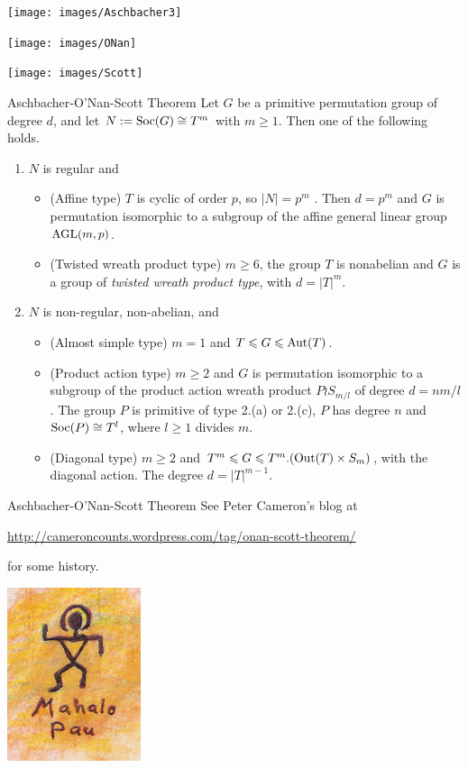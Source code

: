\documentclass[xcolor=dvipsnames,11pt,hide notes]{beamer}
\theoremstyle{definition}
\theoremstyle{remark}
\numberwithin{theorem}{section}
\numberwithin{claim}{section}
\numberwithin{equation}{section}
\numberwithin{conjecture}{section}
\begin{document}
\begin{frame}[fragile,label=OSTheorem]{}
\vskip2mm
\hskip3mm
\texttt{[image: images/Aschbacher3]}
\begin{center}
\texttt{[image: images/ONan]}
\end{center}
\hfill    
\texttt{[image: images/Scott]}

\end{frame}

\begin{frame}[fragile,label=OSTheorem]{Aschbacher-O'Nan-Scott Theorem}
Let $G$ be a primitive permutation
group of degree $d$, and let $N := \mathrm{Soc}(G) \cong T^m$ with $m \geq 1$. 
Then one of the following holds.
\vskip2mm
\begin{enumerate}
\item 
$N$ is regular and
  \begin{itemize}
  \item 
  \alert{(Affine type)} $T$ is cyclic of order $p$, so $|N| = p^m$ . Then 
$d = p^m$ and $G$ is permutation isomorphic to a subgroup of the affine
general linear group $\mathrm{AGL}(m,p)$.
\vskip2mm
\item \alert{(Twisted wreath product type)} $m \geq 6$, the group $T$ is 
  nonabelian and $G$ is a group of \emph{twisted wreath product type}, with
  $d = |T|^m$.
  \end{itemize}
\vskip2mm
\item $N$ is non-regular, non-abelian, and
  \begin{itemize}
  \item 
\alert{(Almost simple type)} $m = 1$ and $T \leqslant G \leqslant \mathrm{Aut}(T)$.
\vskip2mm
\item \alert{(Product action type)} $m \geq 2$ and $G$ is permutation isomorphic to a
subgroup of the product action wreath product $P \wr S_{m/l}$ of degree
$d = nm/l$. The group $P$ is primitive of type 2.(a) or 2.(c), $P$ has
degree $n$ and $\mathrm{Soc}(P) \cong T^l$, where $l \geq 1$ divides $m$.
\vskip2mm
\item 
\alert{(Diagonal type)} $m \geq 2$ and $T^m \leqslant G \leqslant T^m . (\mathrm{Out}(T ) \times S_m)$, with
the diagonal action. The degree $d = |T|^{m-1}$.
  \end{itemize}
\end{enumerate}
\end{frame}

\begin{frame}[fragile,label=OSTheorem]{Aschbacher-O'Nan-Scott Theorem}
See Peter Cameron's blog at 
\begin{center}
{\small  \url{http://cameroncounts.wordpress.com/tag/onan-scott-theorem/}}
\end{center}
 for some history.
\end{frame}

\begin{frame}[fragile,label=FinalConclusions]{}
  \begin{center}
  \includegraphics[height=2in]{images/MahaloPau}
  \end{center}
\end{frame}
\end{document}
